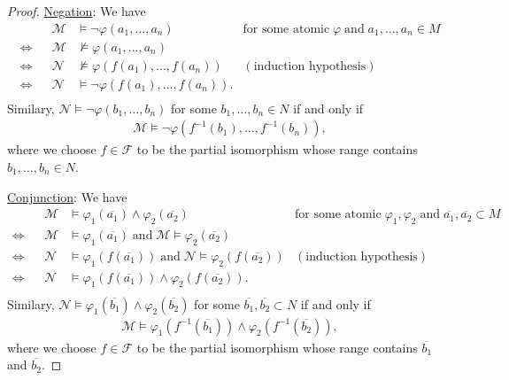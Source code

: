 \documentclass{article}
\begin{document}
\begin{enumerate}[label={\bf Q\arabic*:}]
\begin{proof}
      \underline{Negation}: We have
      \begin{align*}
                    && \mathcal{M}
                    & \models\neg\varphi(a_1,\ldots,a_n)
                    & \text{for some atomic}\; \varphi\; \text{and}\;
                      a_1,\ldots,a_n\in M \\
        \Leftrightarrow && \mathcal{M}
                    & \not\models\varphi(a_1,\ldots,a_n) & \\
        \Leftrightarrow && \mathcal{N}
                    & \not\models\varphi(f(a_1),\ldots,f(a_n))
                    & (\text{induction hypothesis}) \\
        \Leftrightarrow && \mathcal{N}
                    & \models\neg\varphi(f(a_1),\ldots,f(a_n)). & \\
      \end{align*}
      Similary, $\mathcal{N}\models\neg\varphi(b_1,\ldots,b_n)$ for some
      $b_1,\ldots,b_n\in N$ if and only if
      \begin{align*}
        \mathcal{M}\models\neg\varphi(f^{-1}(b_1),\ldots,f^{-1}(b_n)),
      \end{align*}
      where we choose $f\in\mathcal{F}$ to be the partial isomorphism whose
      range contains $b_1,\ldots,b_n\in N$.

      \underline{Conjunction}: We have
      \begin{align*}
                    && \mathcal{M}
                    & \models\varphi_1(\overline{a_1})\wedge\varphi_2(\overline{a_2})
                    & \text{for some atomic}\; \varphi_1,\varphi_2\;
                      \text{and}\;
                      \overline{a_1},\overline{a_2}\subset M \\
        \Leftrightarrow && \mathcal{M}
                    & \models\varphi_1(\overline{a_1})\;
                      \text{and}\;
                      \mathcal{M}\models\varphi_2(\overline{a_2}) & \\
        \Leftrightarrow && \mathcal{N}
                    & \models\varphi_1(f(\overline{a_1}))\;
                      \text{and}\;
                      \mathcal{N}\models\varphi_2(f(\overline{a_2}))
                    & (\text{induction hypothesis}) \\
        \Leftrightarrow && \mathcal{N}
                    &
                    \models\varphi_1(f(\overline{a_1}))\wedge\varphi_2(f(\overline{a_2})).
                    & \\
      \end{align*}
      Similary,
      $\mathcal{N}\models\varphi_1(\overline{b_1})\wedge\varphi_2(\overline{b_2})$
      for some
      $\overline{b_1},\overline{b_2}\subset N$ if and only if
      \begin{align*}
        \mathcal{M}\models\varphi_1(f^{-1}(\overline{b_1}))\wedge\varphi_2(f^{-1}(\overline{b_2})),
      \end{align*}
      where we choose $f\in\mathcal{F}$ to be the partial isomorphism whose
      range contains $\overline{b_1}$ and $\overline{b_2}$.


\end{proof}
\end{enumerate}
\end{document}
